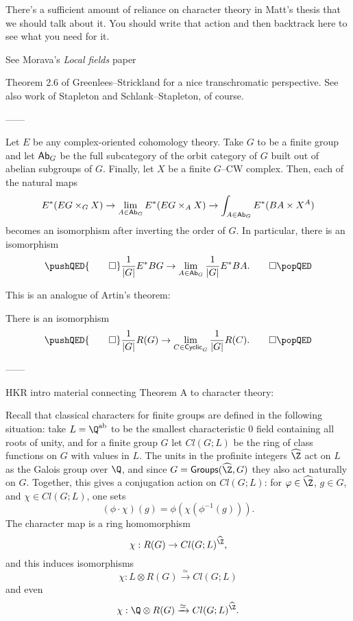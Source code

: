 There's a sufficient amount of reliance on character theory in Matt's thesis that we should talk about it.  You should write that action and then backtrack here to see what you need for it.

See Morava's \textit{Local fields} paper

\begin{remark}
Theorem 2.6 of Greenlees--Strickland for a nice transchromatic perspective.  See also work of Stapleton and Schlank--Stapleton, of course.
\end{remark}


------

\begin{theorem}
Let $E$ be any complex-oriented cohomology theory.  Take $G$ to be a finite group and let $\mathsf{Ab}_G$ be the full subcategory of the orbit category of $G$ built out of abelian subgroups of $G$.  Finally, let $X$ be a finite $G$--CW complex.  Then, each of the natural maps \[E^*(EG \times_G X) \to \lim_{A \in \mathsf{Ab}_G} E^*(EG \times_A X) \to \int_{A \in \mathsf{Ab}_G} E^*(BA \times X^A)\] becomes an isomorphism after inverting the order of $G$.  In particular, there is an isomorphism
\[\pushQED{\qed}
\frac{1}{|G|} E^* BG \to \lim_{A \in \CatOf{Ab}_G} \frac{1}{|G|} E^* BA. \qedhere
\popQED\]
\end{theorem}

This is an analogue of Artin's theorem:
\begin{theorem}
There is an isomorphism
\[\pushQED{\qed}
\frac{1}{|G|} R(G) \to \lim_{C \in \CatOf{Cyclic}_G} \frac{1}{|G|} R(C). \qedhere
\popQED\]
\end{theorem}


------

HKR intro material connecting Theorem A to character theory:

Recall that classical characters for finite groups are defined in the following situation: take $L = \Q^{\mathrm{ab}}$ to be the smallest characteristic $0$ field containing all roots of unity, and for a finite group $G$ let $Cl(G; L)$ be the ring of class functions on $G$ with values in $L$.  The units in the profinite integers $\widehat{\Z}$ act on $L$ as the Galois group over $\Q$, and since $G = \CatOf{Groups}(\widehat{\Z}, G)$ they also act naturally on $G$.  Together, this gives a conjugation action on $Cl(G; L)$: for $\phi \in \widehat{\Z}$, $g \in G$, and $\chi \in Cl(G; L)$, one sets \[(\phi \cdot \chi)(g) = \phi(\chi(\phi^{-1}(g))).\]  The character map is a ring homomorphism \[\chi: R(G) \to Cl(G; L)^{\widehat{\Z}},\] and this induces isomorphisms \[\chi: L \otimes R(G) \xrightarrow{\simeq} Cl(G; L)\] and even \[\chi: \Q \otimes R(G) \xrightarrow{\simeq} Cl(G; L)^{\widehat{\Z}}.\]


